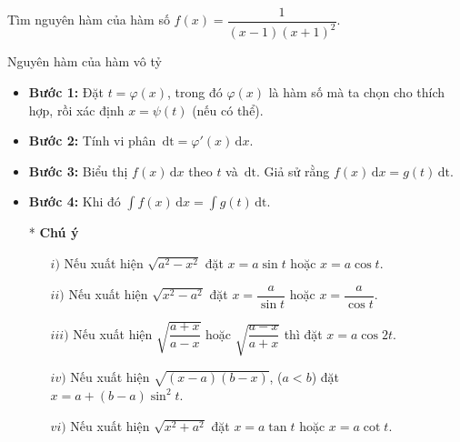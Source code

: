 \begin{bt}%
	Tìm nguyên hàm của hàm số $f(x)=\dfrac{1}{(x-1)(x+1)^2}$.
\end{bt}
\begin{dang}{Nguyên hàm của hàm vô tỷ}
\begin{itemize}
	\item  \textbf{Bước 1:} Đặt $t=\varphi (x)$, trong đó $\varphi (x)$ là hàm số mà ta chọn cho thích hợp, rồi xác định $x=\psi (t)$ (nếu có thể).
	\item \textbf{Bước 2:} Tính vi phân $\mathrm{\,dt}={\varphi}'(x)\mathrm{\,d}x.$
	\item \textbf{Bước 3:} Biểu thị $f(x)\mathrm{\,d}x$ theo $t$ và $\mathrm{\,dt}$. Giả sử rằng $f(x)\mathrm{\,d}x=g(t)\mathrm{\,dt}.$
	\item \textbf{Bước 4:} Khi đó $\displaystyle\int{f(x)}\mathrm{\,d}x=\displaystyle\int{g(t)}\mathrm{\,dt}.$
	\item [*] \textbf{Chú ý}
	\begin{itemize}
	\item [$i)$] Nếu xuất hiện $\sqrt{a^2-x^2}$ đặt $x=a\sin t$ hoặc $x=a\cos t$.
	\item [$ii)$] Nếu xuất hiện $\sqrt{x^2-a^2}$ đặt $x=\dfrac{a}{\sin t}$ hoặc $x=\dfrac{a}{\cos t}$.
	\item [$iii)$] Nếu xuất hiện $\sqrt{\dfrac{a+x}{a-x}}$ hoặc $\sqrt{\dfrac{a-x}{a+x}}$ thì đặt $x=a\cos 2t$.
	\item [$iv)$] Nếu xuất hiện $\sqrt{(x-a)(b-x)}$, ($a<b$) đặt $x=a+(b-a)\sin^2t$.
	\item [$vi)$] Nếu xuất hiện $\sqrt{x^2+a^2}$  đặt $x=a\tan t$ hoặc $x=a\cot t$.
	\end{itemize}
\end{itemize}
\end{dang}
